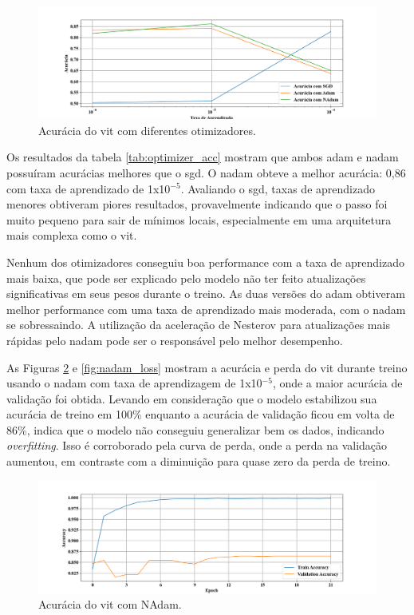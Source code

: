 \begin{figure}[tb]
\centerline{\includegraphics[width=1\linewidth]{images/resultados/optimizer_acc.png}}
\caption{Acurácia do \acrshort{vit} com diferentes otimizadores.}
\label{fig:optmizer_acc}
\end{figure}

Os resultados da tabela \ref{tab:optimizer_acc} mostram que ambos \acrshort{adam} e \acrshort{nadam} possuíram acurácias melhores que o \acrshort{sgd}. 
O \acrshort{nadam} obteve a melhor acurácia: 0,86 com taxa de aprendizado de 1x10$^{-5}$.
Avaliando o \acrshort{sgd}, taxas de aprendizado menores obtiveram piores resultados, provavelmente indicando que o passo foi muito pequeno para sair de mínimos locais, especialmente em uma arquitetura mais complexa como o \acrshort{vit}. 

Nenhum dos otimizadores conseguiu boa performance com a taxa de aprendizado mais baixa, 
que pode ser explicado pelo modelo não ter feito atualizações significativas em seus pesos durante o treino.
As duas versões do \acrshort{adam} obtiveram melhor performance com uma taxa de aprendizado mais moderada, com o \acrshort{nadam} se sobressaindo. 
A utilização da aceleração de Nesterov para atualizações mais rápidas pelo \acrshort{nadam} pode ser o responsável pelo melhor desempenho.

As Figuras \ref{fig:nadam_acc} e \ref{fig:nadam_loss} mostram a acurácia e perda do \acrshort{vit} durante treino 
usando o \acrshort{nadam} com taxa de aprendizagem de 1x10$^{-5}$, onde a maior acurácia de validação foi obtida.
Levando em consideração que o modelo estabilizou sua acurácia de treino em 100\% enquanto a acurácia de validação ficou em volta de 86\%,
indica que o modelo não conseguiu generalizar bem os dados, indicando \textit{overfitting}.
Isso é corroborado pela curva de perda, onde a perda na validação aumentou, em contraste com a diminuição para quase zero da perda de treino.

\begin{figure}[tb]
\centerline{\includegraphics[width=1\linewidth]{images/resultados/nadam_accuracy.png}}
\caption{Acurácia do \acrshort{vit} com NAdam.}
\label{fig:nadam_acc}
\end{figure}

